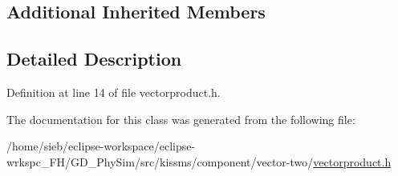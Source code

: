 \subsection*{Additional Inherited Members}


\subsection{Detailed Description}


Definition at line 14 of file vectorproduct.\-h.



The documentation for this class was generated from the following file\-:\begin{DoxyCompactItemize}
\item 
/home/sieb/eclipse-\/workspace/eclipse-\/wrkspc\-\_\-\-F\-H/\-G\-D\-\_\-\-Phy\-Sim/src/kissms/component/vector-\/two/\hyperlink{vectorproduct_8h}{vectorproduct.\-h}\end{DoxyCompactItemize}
